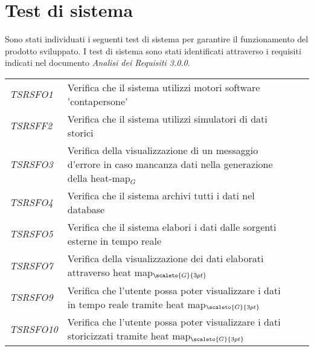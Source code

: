 \section{Test di sistema}\label{SpecificaDeiTestTestDiSistema}
Sono stati individuati i seguenti test di sistema per garantire il funzionamento del prodotto sviluppato. I test di sistema sono stati identificati attraverso i requisiti indicati nel documento \textit{Analisi dei Requisiti 3.0.0}. 
\def\tabularxcolumn#1{m{#1}}
{
	
	\begin{center}
		\renewcommand{\arraystretch}{1.4}
		\begin{longtable}{|p{3cm}|p{8cm}|p{2cm}|p{2cm}|}
			\hline
			\rowcolor{airforceblue}
			\makecell[c]{\textbf{Id Test}} & \makecell[c]{\textbf{Descrizione}} & \makecell[c]{\textbf{Esito}} & \makecell[c]{\textbf{Qualità}} \\
			\hline
			\textit{TSRSFO1} & Verifica che il sistema utilizzi motori software 'contapersone' & \makecell[tc]{\textit{NI}} & \makecell[tc]{\textit{-}} \\
			\hline
			\textit{TSRSFF2} & Verifica che il sistema utilizzi simulatori di dati storici & \makecell[tc]{\textit{NI}} & \makecell[tc]{\textit{-}}\\
			\hline
			\textit{TSRSFO3} & Verifica della visualizzazione di un messaggio d'errore in caso mancanza dati nella generazione della heat-map$_G$ &\makecell[tc]{\textit{NI}} & \makecell[tc]{\textit{-}}\\
			\hline
			\textit{TSRSFO4} & Verifica che il sistema archivi tutti i dati nel database & \makecell[tc]{\textit{NI}} & \makecell[tc]{\textit{-}}\\
			\hline
			\textit{TSRSFO5} & Verifica che il sistema elabori i dati dalle sorgenti esterne in tempo reale & \makecell[tc]{\textit{NI}} & \makecell[tc]{\textit{-}}\\
			\hline
			\textit{TSRSFO7} & Verifica della visualizzazione dei dati elaborati attraverso heat map$_{\scaleto{G}{3pt}}$ & \makecell[tc]{\textit{NI}} & \makecell[tc]{\textit{-}}\\
			\hline
			\textit{TSRSFO9} & Verifica che l’utente possa poter visualizzare i dati in tempo reale tramite heat map$_{\scaleto{G}{3pt}}$ & \makecell[tc]{\textit{NI}} & \makecell[tc]{\textit{-}}\\
			\hline
			\textit{TSRSFO10} & Verifica che l’utente possa poter visualizzare i dati storicizzati tramite heat map$_{\scaleto{G}{3pt}}$ & \makecell[tc]{\textit{NI}} & \makecell[tc]{\textit{-}}\\

\end{longtable}
\end{center}}
